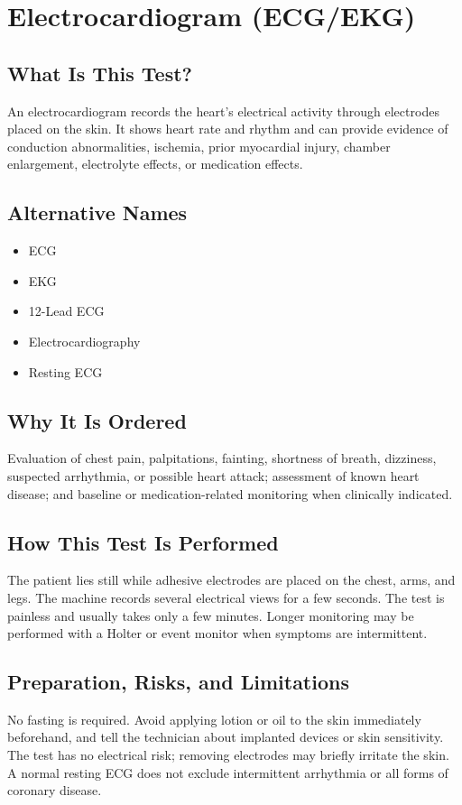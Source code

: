 \chapter{Electrocardiogram (ECG/EKG)}

\section*{What Is This Test?}
An electrocardiogram records the heart's electrical activity through electrodes placed on the skin. It shows heart rate and rhythm and can provide evidence of conduction abnormalities, ischemia, prior myocardial injury, chamber enlargement, electrolyte effects, or medication effects.

\section*{Alternative Names}
\begin{itemize}
  \item ECG
  \item EKG
  \item 12-Lead ECG
  \item Electrocardiography
  \item Resting ECG
\end{itemize}
\section*{Why It Is Ordered}
Evaluation of chest pain, palpitations, fainting, shortness of breath, dizziness, suspected arrhythmia, or possible heart attack; assessment of known heart disease; and baseline or medication-related monitoring when clinically indicated.

\section*{How This Test Is Performed}
The patient lies still while adhesive electrodes are placed on the chest, arms, and legs. The machine records several electrical views for a few seconds. The test is painless and usually takes only a few minutes. Longer monitoring may be performed with a Holter or event monitor when symptoms are intermittent.

\section*{Preparation, Risks, and Limitations}
No fasting is required. Avoid applying lotion or oil to the skin immediately beforehand, and tell the technician about implanted devices or skin sensitivity. The test has no electrical risk; removing electrodes may briefly irritate the skin. A normal resting ECG does not exclude intermittent arrhythmia or all forms of coronary disease.


